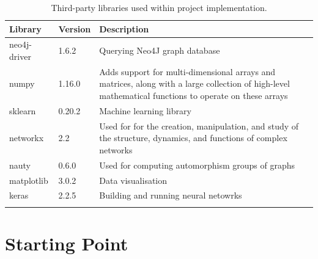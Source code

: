 \begin{longtable}{|p{}|p{}|p{}|}
  \hline
  \textbf{Library} & \textbf{Version} & \textbf{Description}                                                                                                                                  \\
  \hline
  neo4j-driver     & 1.6.2            & Querying Neo4J graph database                                                                                                                         \\

  numpy            & 1.16.0           & Adds support for multi-dimensional arrays and matrices, along with a large collection of high-level mathematical functions to operate on these arrays \\

  sklearn          & 0.20.2           & Machine learning library                                                                                                                              \\

  networkx         & 2.2              & Used for for the creation, manipulation, and study of the structure, dynamics, and functions of complex networks                                      \\
  nauty            & 0.6.0            & Used for computing automorphism groups of graphs                                                                                                      \\

  matplotlib       & 3.0.2            & Data visualisation                                                                                                                                    \\
    
  keras           & 2.2.5             & Building and running neural netowrks \\

  \hline
  \caption[Libraries]{Third-party libraries used within project implementation.}
  \label{Libraries}
\end{longtable} 

\section{Starting Point}

